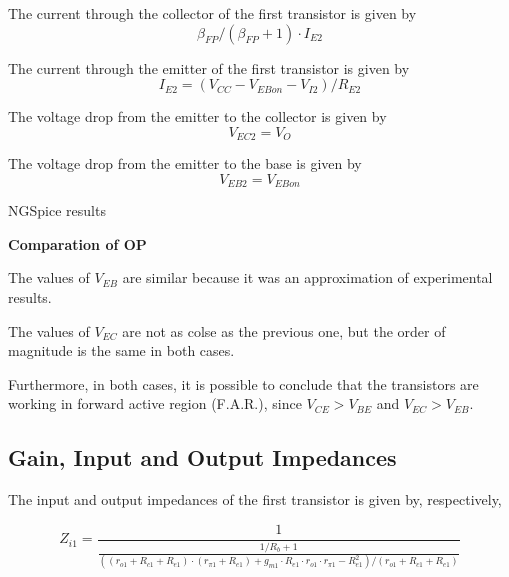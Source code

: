 The current through the collector of the first transistor is given by $$\beta_{FP}/(\beta_{FP}+1)\cdot I_{E2}$$

The current through the emitter of the first transistor is given by $$I_{E2} = (V_{CC}-V_{EBon}-V_{I2})/R_{E2}$$

The voltage drop from the emitter to the collector is given by $$ V_{EC2} = V_{O} $$

The voltage drop from the emitter to the base is given by $$ V_{EB2} = V_{EBon} $$


\vspace{0.5cm}


\vspace{0.5cm}

NGSpice results

\vspace{0.5cm}


\vspace{0.5cm}

\textbf{Comparation of OP} 

\indent

The values of $V_{EB}$ are similar because it was an approximation of experimental results.

The values of $V_{EC}$ are not as colse as the previous one, but the order of magnitude is the same in both cases.

Furthermore, in both cases, it is possible to conclude that the transistors are working in forward active region (F.A.R.), since $V_{CE} > V_{BE}$ and $V_{EC} > V_{EB}$.





\indent



\subsection{Gain, Input and Output Impedances}

The input and output impedances of the first transistor is given by, respectively,

$$Z_{i1} = \frac {1}{\frac {1/R_b+1}{((r_{o1}+R_{c1}+R_{e1})\cdot (r_{\pi 1}+R_{e1})+g_{m1}\cdot R_{e1}\cdot r_{o1}\cdot r_{\pi 1} - R_{e1}^2)/(r_{o1}+R_{c1}+R_{e1})}}$$

